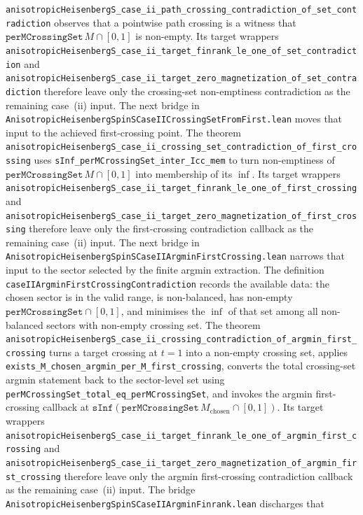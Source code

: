 \documentclass[a4paper,11pt]{article}
\begin{document}
\texttt{anisotropicHeisenbergS\_case\_ii\_path\_crossing\_contradiction\_of\_set\_contradiction}
observes that a pointwise path crossing is a witness that
\(\texttt{perMCrossingSet}\,M\cap[0,1]\) is non-empty.  Its target wrappers
\texttt{anisotropicHeisenbergS\_case\_ii\_target\_finrank\_le\_one\_of\_set\_contradiction}
and
\texttt{anisotropicHeisenbergS\_case\_ii\_target\_zero\_magnetization\_of\_set\_contradiction}
therefore leave only the crossing-set non-emptiness contradiction as the
remaining case~(ii) input.  The next bridge in
\texttt{AnisotropicHeisenbergSpinSCaseIICrossingSetFromFirst.lean} moves that
input to the achieved first-crossing point.  The theorem
\texttt{anisotropicHeisenbergS\_case\_ii\_crossing\_set\_contradiction\_of\_first\_crossing}
uses
\texttt{sInf\_perMCrossingSet\_inter\_Icc\_mem} to turn non-emptiness of
\(\texttt{perMCrossingSet}\,M\cap[0,1]\) into membership of its
\(\inf\).  Its target wrappers
\texttt{anisotropicHeisenbergS\_case\_ii\_target\_finrank\_le\_one\_of\_first\_crossing}
and
\texttt{anisotropicHeisenbergS\_case\_ii\_target\_zero\_magnetization\_of\_first\_crossing}
therefore leave only the first-crossing contradiction callback as the
remaining case~(ii) input.  The next bridge in
\texttt{AnisotropicHeisenbergSpinSCaseIIArgminFirstCrossing.lean} narrows
that input to the sector selected by the finite argmin extraction.  The
definition \texttt{caseIIArgminFirstCrossingContradiction} records the
available data: the chosen sector is in the valid range, is non-balanced, has
non-empty \(\texttt{perMCrossingSet}\cap[0,1]\), and minimises the
\(\inf\) of that set among all non-balanced sectors with non-empty crossing
set.  The theorem
\texttt{anisotropicHeisenbergS\_case\_ii\_crossing\_contradiction\_of\_argmin\_first\_crossing}
turns a target crossing at \(t=1\) into a non-empty crossing set, applies
\texttt{exists\_M\_chosen\_argmin\_per\_M\_first\_crossing}, converts the
total crossing-set argmin statement back to the sector-level set using
\texttt{perMCrossingSet\_total\_eq\_perMCrossingSet}, and invokes the argmin
first-crossing callback at
\(\texttt{sInf}(\texttt{perMCrossingSet}\,M_{\mathrm{chosen}}\cap[0,1])\).
Its target wrappers
\texttt{anisotropicHeisenbergS\_case\_ii\_target\_finrank\_le\_one\_of\_argmin\_first\_crossing}
and
\texttt{anisotropicHeisenbergS\_case\_ii\_target\_zero\_magnetization\_of\_argmin\_first\_crossing}
therefore leave only the argmin first-crossing contradiction callback as the
remaining case~(ii) input.  The bridge
\texttt{AnisotropicHeisenbergSpinSCaseIIArgminFinrank.lean} discharges that
\end{document}
